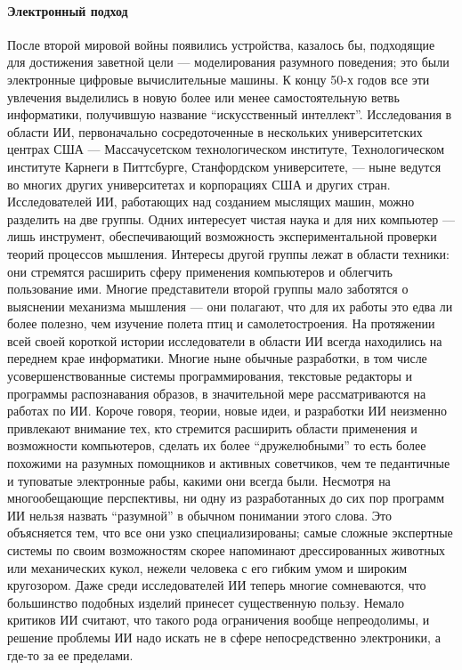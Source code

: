 \paragraph{Электронный подход}

После второй мировой войны появились устройства, казалось бы, подходящие для достижения заветной цели --- моделирования разумного поведения; это были электронные цифровые вычислительные машины. К концу 50-х годов все эти увлечения выделились в новую более или менее самостоятельную ветвь информатики, получившую название ``искусственный интеллект''. Исследования в области ИИ, первоначально сосредоточенные в нескольких университетских центрах США --- Массачусетском технологическом институте, Технологическом институте Карнеги в Питтсбурге, Станфордском университете, --- ныне ведутся во многих других университетах и корпорациях США и других стран. Исследователей ИИ, работающих над созданием мыслящих машин, можно разделить на две группы. Одних интересует чистая наука и для них компьютер --- лишь инструмент, обеспечивающий возможность экспериментальной проверки теорий процессов мышления. Интересы другой группы лежат в области техники: они стремятся расширить сферу применения компьютеров и облегчить пользование ими. Многие представители второй группы мало заботятся о выяснении механизма мышления --- они полагают, что для их работы это едва ли более полезно, чем изучение полета птиц и самолетостроения. На протяжении всей своей короткой истории исследователи в области ИИ всегда находились на переднем крае информатики. Многие ныне обычные разработки, в том числе усовершенствованные системы программирования, текстовые редакторы и программы распознавания образов, в значительной мере рассматриваются на работах по ИИ. Короче говоря, теории, новые идеи, и разработки ИИ неизменно привлекают внимание тех, кто стремится расширить области применения и возможности компьютеров, сделать их более ``дружелюбными'' то есть более похожими на разумных помощников и активных советчиков, чем те педантичные и туповатые электронные рабы, какими они всегда были. Несмотря на многообещающие перспективы, ни одну из разработанных до сих пор программ ИИ нельзя назвать ``разумной'' в обычном понимании этого слова. Это объясняется тем, что все они узко специализированы; самые сложные экспертные системы по своим возможностям скорее напоминают дрессированных животных или механических кукол, нежели человека с его гибким умом и широким кругозором. Даже среди исследователей ИИ теперь многие сомневаются, что большинство подобных изделий принесет существенную пользу. Немало критиков ИИ считают, что такого рода ограничения вообще непреодолимы, и решение проблемы ИИ надо искать не в сфере непосредственно электроники, а где-то за ее пределами.

